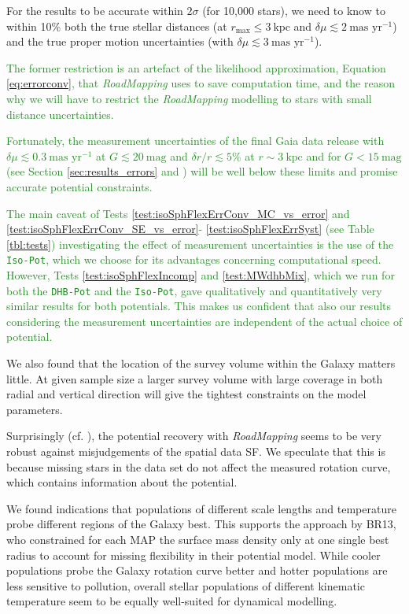 \documentclass[iop,revtex4,numberedappendix,appendixfloats]{emulateapj}
\newcommand{\MAP}{MAP}
\newcommand{\RM}{{\sl RoadMapping}}
\newcommand{\NEW}[1]{\textcolor{ForestGreen}{#1}}
\begin{document}
For the results to be accurate within $2\sigma$ (for 10,000 stars), we need to know to within 10\% both the true stellar distances (at $r_\text{max} \leq 3~\text{kpc}$ and $\delta \mu \lesssim 2 ~ \text{mas yr}^{-1}$) and the true proper motion uncertainties (with $\delta \mu \lesssim 3 ~ \text{mas yr}^{-1}$).

\NEW{The former restriction is an artefact of the likelihood approximation, Equation \eqref{eq:errorconv}, that \RM{} uses to save computation time, and the reason why we will have to restrict the \RM{} modelling to stars with small distance uncertainties.}

\NEW{Fortunately, the measurement uncertainties of the final Gaia data release with $\delta\mu\lesssim0.3~\text{mas yr}^{-1}$ at $G\lesssim20~\text{mag}$ and $\delta r/r\lesssim5\%$ at $r\sim3~\text{kpc}$ and for $G<15~\text{mag}$ (see Section \ref{sec:results_errors} and \citealt{2014EAS....67...23D}) will be well below these limits and promise accurate potential constraints. }

\NEW{The main caveat of Tests \ref{test:isoSphFlexErrConv_MC_vs_error} and \ref{test:isoSphFlexErrConv_SE_vs_error}- \ref{test:isoSphFlexErrSyst} (see Table \ref{tbl:tests}) investigating the effect of measurement uncertainties is the use of the \texttt{Iso-Pot}, which we choose for its advantages concerning computational speed. However, Tests \ref{test:isoSphFlexIncomp} and \ref{test:MWdhbMix}, which we run for both the \texttt{DHB-Pot} and the \texttt{Iso-Pot}, gave qualitatively and quantitatively very similar results for both potentials. This makes us confident that also our results considering the measurement uncertainties are independent of the actual choice of potential.}

We also found that the location of the survey volume within the Galaxy matters little. At given sample size a larger survey volume with large coverage in both radial and vertical direction will give the tightest constraints on the model parameters.

Surprisingly (cf. \citealt{2013A&ARv..21...61R}), the potential recovery with \RM{} seems to be very robust against misjudgements of the spatial data SF. We speculate that this is because missing stars in the data set do not affect the measured rotation curve, which contains information about the potential.

We found indications that populations of different scale lengths and temperature probe different regions of the Galaxy best. This supports the approach by BR13, who constrained for each \MAP{} the surface mass density only at one single best radius to account for missing flexibility in their potential model. While cooler populations probe the Galaxy rotation curve better and hotter populations are less sensitive to pollution, overall stellar populations of different kinematic temperature seem to be equally well-suited for dynamical modelling.\\
\end{document}
